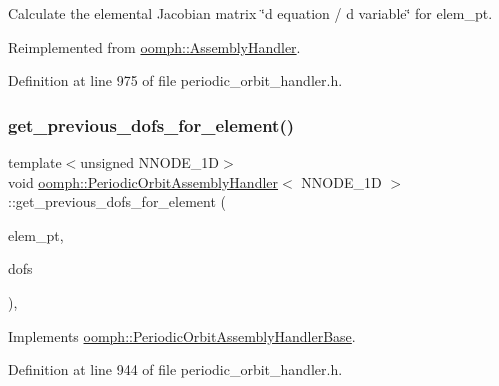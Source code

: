 Calculate the elemental Jacobian matrix \char`\"{}d equation 
/ d variable\char`\"{} for elem\+\_\+pt. 



Reimplemented from \hyperlink{classoomph_1_1AssemblyHandler_ad43c3d8760be0ba6ebee8d82509458e5}{oomph\+::\+Assembly\+Handler}.



Definition at line 975 of file periodic\+\_\+orbit\+\_\+handler.\+h.

\mbox{\label{classoomph_1_1PeriodicOrbitAssemblyHandler_a681a727dc0a463e924aa88e0e691e2c6}} 
\subsubsection{\texorpdfstring{get\+\_\+previous\+\_\+dofs\+\_\+for\+\_\+element()}{get\_previous\_dofs\_for\_element()}}
{\footnotesize\ttfamily template$<$unsigned N\+N\+O\+D\+E\+\_\+1D$>$ \\
void \hyperlink{classoomph_1_1PeriodicOrbitAssemblyHandler}{oomph\+::\+Periodic\+Orbit\+Assembly\+Handler}$<$ N\+N\+O\+D\+E\+\_\+1D $>$\+::get\+\_\+previous\+\_\+dofs\+\_\+for\+\_\+element (\begin{DoxyParamCaption}\item[{\hyperlink{classoomph_1_1GeneralisedElement}{Generalised\+Element} $\ast$const}]{elem\+\_\+pt,  }\item[{\hyperlink{classoomph_1_1Vector}{Vector}$<$ double $>$ \&}]{dofs }\end{DoxyParamCaption})\hspace{0.3cm}{\ttfamily [inline]}, {\ttfamily [virtual]}}



Implements \hyperlink{classoomph_1_1PeriodicOrbitAssemblyHandlerBase_a680c82526671e8213d317367f3f7a7e1}{oomph\+::\+Periodic\+Orbit\+Assembly\+Handler\+Base}.



Definition at line 944 of file periodic\+\_\+orbit\+\_\+handler.\+h.



